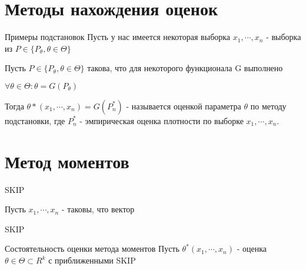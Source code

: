 \section{Методы нахождения оценок}
Примеры подстановок
Пусть у нас имеется некоторая выборка $x_1, \cdots, x_n$ - выборка из $P \in \{P_{\theta}, \theta \in \Theta\}$

Пусть $P \in \{P_{\theta}, \theta \in \Theta\}$ такова, что для некоторого функционала G выполнено

$\forall \theta \in \Theta: \theta = G(P_{\theta})$

Тогда $\theta*(x_1, \cdots, x_n) = G(P_n^*)$ - называется оценкой параметра $\theta$ по методу подстановки,
где $P_n^*$ - эмпирическая оценка плотности по выборке $x_1, \cdots, x_n$.

\section{Метод моментов}
SKIP

Пусть $x_1, \cdots, x_n$ - таковы, что вектор

SKIP


\begin{theorem} Состоятельность оценки метода моментов
    Пусть $\theta^*(x_1, \cdots, x_n)$ - оценка $\theta \in \Theta \subset R^k$ с приближенными SKIP
\end{theorem}
